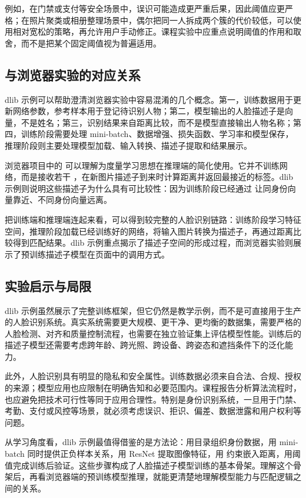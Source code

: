 例如，在门禁或支付等安全场景中，误识可能造成更严重后果，因此阈值应更严格；在照片聚类或相册整理场景中，偶尔把同一人拆成两个簇的代价较低，可以使用相对宽松的策略，再允许用户手动修正。课程实验中应重点说明阈值的作用和取舍，而不是把某个固定阈值视为普遍适用。

\subsection{与浏览器实验的对应关系}

dlib 示例可以帮助澄清浏览器实验中容易混淆的几个概念。第一，训练数据用于更新网络参数，参考样本用于登记待识别人物；第二，模型输出的人脸描述子是向量，不是姓名；第三，识别结果来自距离比较，而不是模型直接输出人物名称；第四，训练阶段需要处理 mini-batch、数据增强、损失函数、学习率和模型保存，推理阶段则主要处理模型加载、输入转换、描述子提取和结果展示。

浏览器项目中的  可以理解为度量学习思想在推理端的简化使用。它并不训练网络，而是接收若干 ，在新图片描述子到来时计算距离并返回最接近的标签。dlib 示例则说明这些描述子为什么具有可比较性：因为训练阶段已经通过  让同身份向量靠近、不同身份向量远离。

把训练端和推理端连起来看，可以得到较完整的人脸识别链路：训练阶段学习特征空间，推理阶段加载已经训练好的网络，将输入图片转换为描述子，再通过距离比较得到匹配结果。dlib 示例重点揭示了描述子空间的形成过程，而浏览器实验则展示了预训练描述子模型在页面中的调用方式。

\subsection{实验启示与局限}

dlib 示例虽然展示了完整训练框架，但它仍然是教学示例，而不是可直接用于生产的人脸识别系统。真实系统需要更大规模、更干净、更均衡的数据集，需要严格的人脸检测、对齐和质量控制流程，也需要在独立验证集上评估模型性能。训练后的描述子模型还需要考虑跨年龄、跨光照、跨设备、跨姿态和遮挡条件下的泛化能力。

此外，人脸识别具有明显的隐私和安全属性。训练数据必须来自合法、合规、授权的来源；模型应用也应限制在明确告知和必要范围内。课程报告分析算法流程时，也应避免把技术可行性等同于应用合理性。特别是身份识别系统，一旦用于门禁、考勤、支付或风控等场景，就必须考虑误识、拒识、偏差、数据泄露和用户权利等问题。

从学习角度看，dlib 示例最值得借鉴的是方法论：用目录组织身份数据，用 mini-batch 同时提供正负样本关系，用 ResNet 提取图像特征，用  约束嵌入距离，用阈值完成训练后验证。这些步骤构成了人脸描述子模型训练的基本骨架。理解这个骨架后，再看浏览器端的预训练模型推理，就能更清楚地理解模型能力与匹配逻辑之间的关系。

